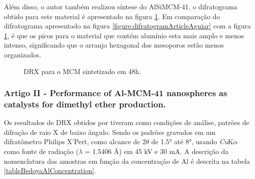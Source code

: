 Além disso, o autor também realizou síntese do AlSiMCM-41, o difratograma obtido
para este material é apresentado na figura \ref{figure:AlSiMCM-41Aguiar2019}.
Em comparação do difratograma apresentado na figura \ref{figure:difratogramArticleAguiar}
com a figura \ref{figure:AlSiMCM-41Aguiar2019}, é que os picos para o material
que contém alumínio esta mais amplo e menos intenso, significando que o arranjo
hexagonal dos mesoporos estão menos organizados.

\begin{figure}[ht]
    \center
    \begin{minipage}{14cm}
     \caption{DRX para o MCM sintetizado em 48h.}\label{figure:AlSiMCM-41Aguiar2019} 
     \end{minipage}
\end{figure}

\subsubsection*{\textbf{Artigo II} - Performance of Al-MCM-41 nanospheres as catalysts for dimethyl
ether production.}

Os resultados de DRX obtidos por  tiveram como condições de análise,
patrões de difração de raio X de baixo ângulo. Sendo os padrões gravados em um difratômetro Philips
X'Pert, como alcance de 2$\theta$ de 1.5° até 8°, usando \textit{Cu}K{$\alpha$} como fonte de 
radiação ($\lambda$ = 1.5406 \AA) em 45 kV e 30 mA. A descrição da nomenclatura das amostras
em função da concentração de Al é descrita na tabela \ref{tableBedoyaAlConcentration}.

